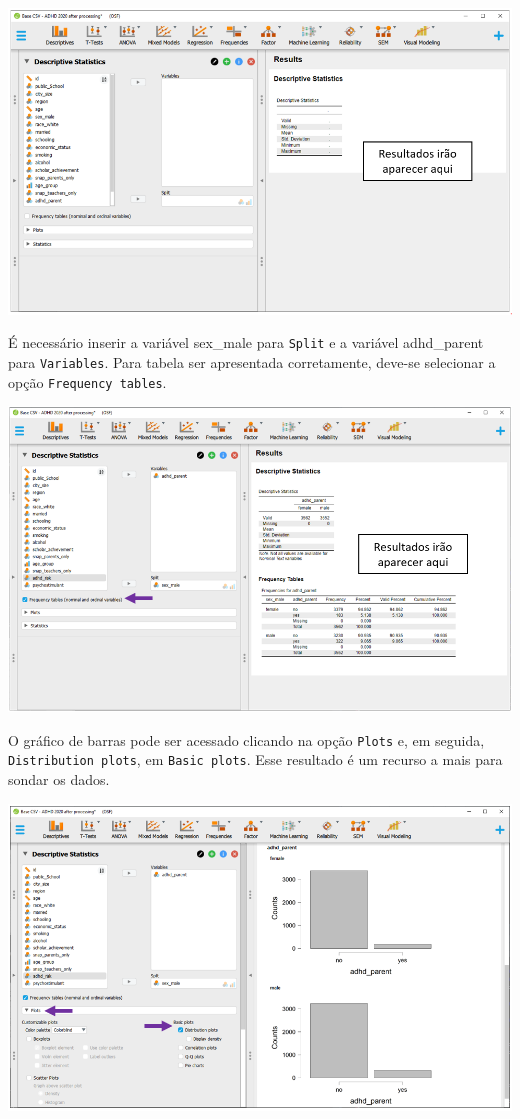 \documentclass[
]{book}
\begin{document}
\includegraphics{./img/cap_x2_primeira_tabela.png}

É necessário inserir a variável sex\_male para \texttt{Split} e a variável adhd\_parent para \texttt{Variables}. Para tabela ser apresentada corretamente, deve-se selecionar a opção \texttt{Frequency\ tables}.

\includegraphics{./img/cap_x2_descritivo.png}

O gráfico de barras pode ser acessado clicando na opção \texttt{Plots} e, em seguida, \texttt{Distribution\ plots}, em \texttt{Basic\ plots}. Esse resultado é um recurso a mais para sondar os dados.

\includegraphics{./img/cap_x2_grafico.png}
\end{document}

